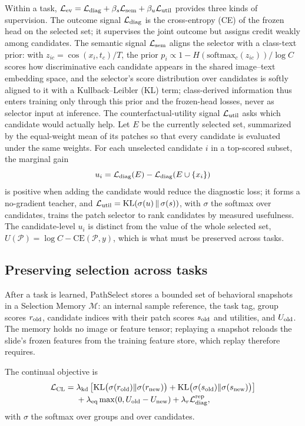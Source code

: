 \documentclass{article}
\def\L{{\cal L}}
\newcommand{\Psel}{\mathcal{P}}
\newcommand{\Mem}{\mathcal{M}}
\begin{document}
Within a task, $\L_{\mathrm{ev}}=\L_{\mathrm{diag}}+\beta_s\L_{\mathrm{sem}}+\beta_u\L_{\mathrm{util}}$ provides three kinds of supervision. The outcome signal $\L_{\mathrm{diag}}$ is the cross-entropy (CE) of the frozen head on the selected set; it supervises the joint outcome but assigns credit weakly among candidates. The semantic signal $\L_{\mathrm{sem}}$ aligns the selector with a class-text prior: with $z_{ic}=\cos(x_i,t_c)/T$, the prior $p_i\propto 1-H(\mathrm{softmax}_c(z_{ic}))/\log C$ scores how discriminative each candidate appears in the shared image--text embedding space, and the selector's score distribution over candidates is softly aligned to it with a Kullback--Leibler (KL) term; class-derived information thus enters training only through this prior and the frozen-head losses, never as selector input at inference. The counterfactual-utility signal $\L_{\mathrm{util}}$ asks which candidate would actually help. Let $E$ be the currently selected set, summarized by the equal-weight mean of its patches so that every candidate is evaluated under the same weights. For each unselected candidate $i$ in a top-scored subset, the marginal gain
\begin{equation}
u_i
=
\L_{\mathrm{diag}}(E)
-
\L_{\mathrm{diag}}(E\cup\{x_i\})
\label{eq:ui}
\end{equation}
is positive when adding the candidate would reduce the diagnostic loss; it forms a no-gradient teacher, and $\L_{\mathrm{util}}=\mathrm{KL}(\sigma(u)\,\Vert\,\sigma(s))$, with $\sigma$ the softmax over candidates, trains the patch selector to rank candidates by measured usefulness. The candidate-level $u_i$ is distinct from the value of the whole selected set, $U(\Psel)=\log C-\mathrm{CE}(\Psel,y)$, which is what must be preserved across tasks.

\subsection{Preserving selection across tasks}
\label{ssec:cl}

After a task is learned, PathSelect stores a bounded set of behavioral snapshots in a Selection Memory $\Mem$: an internal sample reference, the task tag, group scores $r_{\rm old}$, candidate indices with their patch scores $s_{\rm old}$ and utilities, and $U_{\rm old}$. The memory holds no image or feature tensor; replaying a snapshot reloads the slide's frozen features from the training feature store, which replay therefore requires.

The continual objective is
\begin{align}
\L_{\mathrm{CL}}
={}&
\lambda_{\mathrm{kd}}
\left[
\mathrm{KL}\bigl(\sigma(r_{\mathrm{old}})\Vert \sigma(r_{\mathrm{new}})\bigr)
+
\mathrm{KL}\bigl(\sigma(s_{\mathrm{old}})\Vert \sigma(s_{\mathrm{new}})\bigr)
\right]
\nonumber\\
&+
\lambda_{\mathrm{eq}}
\max(0,U_{\mathrm{old}}-U_{\mathrm{new}})
+
\lambda_r \L_{\mathrm{diag}}^{\mathrm{rep}},
\label{eq:lcl}
\end{align}
with $\sigma$ the softmax over groups and over candidates.
\end{document}
